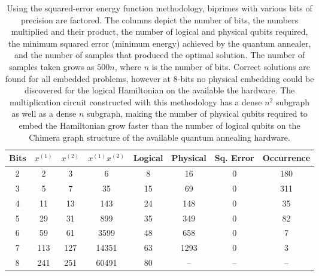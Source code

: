 
\begin{table}
    \centering
    \begin{tabular}{c|c c c|c c|c|c}
         Bits & $x^{(1)}$ & $x^{(2)}$ & $x^{(1)}x^{(2)}$ & Logical & Physical & Sq. Error & Occurrence \\ \hline
         2 & 2 & 3 & 6 & 8 & 16 & 0 & 180 \\
         3 & 5 & 7 & 35 & 15 & 69 & 0 & 311 \\
         4 & 11 & 13 & 143 & 24 & 148 & 0 & 35 \\
         5 & 29 & 31 & 899 & 35 & 349 & 0 & 82 \\
         6 & 59 & 61 & 3599 & 48 & 658 & 0 & 7 \\
         7 & 113 & 127 & 14351 & 63 & 1293 & 0 & 3 \\
         8 & 241 & 251 & 60491 & 80 & -- & -- & -- \\
    \end{tabular}
    \caption{Using the squared-error energy function methodology, biprimes with various bits of precision are factored. The columns depict the number of bits, the numbers multiplied and their product, the number of logical and physical qubits required, the minimum squared error (minimum energy) achieved by the quantum annealer, and the number of samples that produced the optimal solution. The number of samples taken grows as $500n$, where $n$ is the number of bits. Correct solutions are found for all embedded problems, however at 8-bits no physical embedding could be discovered for the logical Hamiltonian on the available the hardware. The multiplication circuit constructed with this methodology has a dense $n^2$ subgraph as well as a dense $n$ subgraph, making the number of physical qubits required to embed the Hamiltonian grow faster than the number of logical qubits on the Chimera graph structure of the available quantum annealing hardware.}
    \label{tab:biprime}
\end{table}